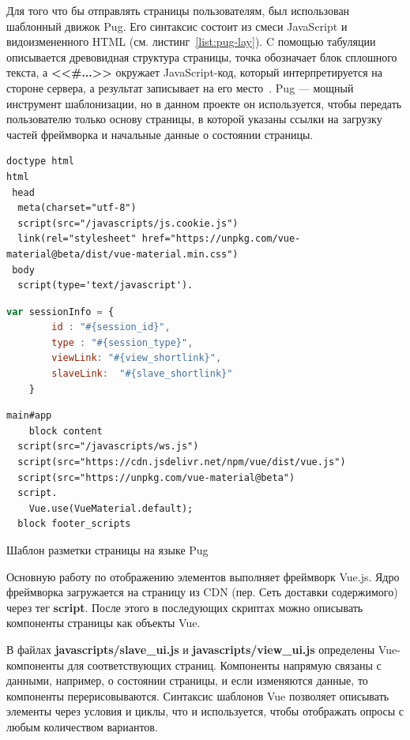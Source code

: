 Для того что бы отправлять страницы пользователям, был использован шаблонный движок Pug. Его синтаксис состоит из смеси JavaScript и видоизмененного HTML (см. листинг~\ref{list:pug-lay}). C помощью табуляции описывается древовидная структура страницы, точка обозначает блок сплошного текста, а \textbf{<<\#{...}>>} окружает JavaScript-код, который интерпретируется на стороне сервера, а результат записывает на его место~\autocite{pug}. Pug --- мощный инструмент шаблонизации, но в данном проекте он используется, чтобы передать пользователю только основу страницы, в которой указаны ссылки на загрузку частей фреймворка и начальные данные о состоянии страницы.
 \begin{ListingEnv}
	\begin{lstlisting}[language=pug]
doctype html
html
 head
  meta(charset="utf-8")
  script(src="/javascripts/js.cookie.js")
  link(rel="stylesheet" href="https://unpkg.com/vue-material@beta/dist/vue-material.min.css")    
 body
  script(type='text/javascript').
  \end{lstlisting}
  \begin{lstlisting}[language=JavaScript]
     var sessionInfo = {
	 	id : "#{session_id}",
	 	type : "#{session_type}",
		viewLink: "#{view_shortlink}",
		slaveLink:  "#{slave_shortlink}"
	}  
\end{lstlisting}
\begin{lstlisting}[language=pug]
  main#app 
	block content
  script(src="/javascripts/ws.js")
  script(src="https://cdn.jsdelivr.net/npm/vue/dist/vue.js")
  script(src="https://unpkg.com/vue-material@beta")
  script.
	Vue.use(VueMaterial.default);
  block footer_scripts
	\end{lstlisting}
	\caption{Шаблон разметки страницы на языке Pug}
	\label{list:pug-lay}
\end{ListingEnv}      

Основную работу по отображению элементов выполняет фреймворк Vue.js. Ядро фреймворка загружается на страницу из CDN (пер. Сеть доставки содержимого) через тег \textbf{script}. После этого в последующих скриптах можно описывать компоненты страницы как объекты Vue. 

В файлах \textbf{javascripts/slave\_ui.js} и \textbf{javascripts/view\_ui.js} определены Vue-компоненты для соответствующих страниц. Компоненты напрямую связаны с данными, например, о состоянии страницы, и если изменяются данные, то компоненты перерисовываются. Синтаксис шаблонов Vue позволяет описывать элементы через условия и циклы, что и используется, чтобы отображать опросы с любым количеством вариантов.

